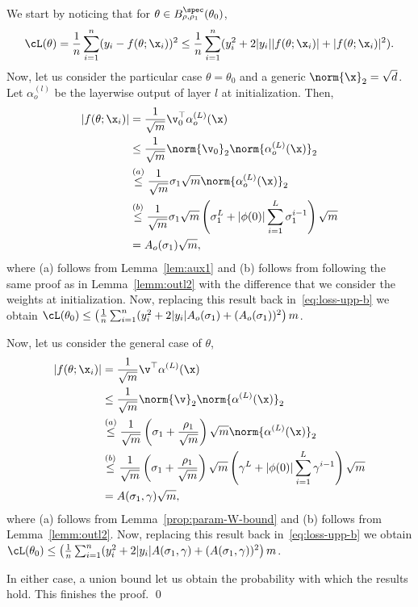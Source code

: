 \proof
We start by noticing that for $\theta \in B_{\rho,\rho_1}^{\spec}(\theta_0)$,
\begin{equation}
    \cL(\theta)=\frac{1}{n}\sum^n_{i=1}(y_i-f(\theta;\x_i))^2\leq\frac{1}{n}\sum^n_{i=1}(y_i^2+2|y_i||f(\theta;\x_i)|+|f(\theta;\x_i)|^2).
    \label{eq:loss-upp-b}
\end{equation}
%
Now, let us consider the particular case $\theta=\theta_0$ and a generic $\norm{\x}_2=\sqrt{d}$. Let $\alpha_o^{(l)}$ be the layerwise output of layer $l$ at initialization. Then,
\begin{align*}
    |f(\theta;\x_i)|&=\frac{1}{\sqrt{m}}\v_0^\top\alpha_o^{(L)}(\x)\\
    &\leq \frac{1}{\sqrt{m}}\norm{\v_0}_2\norm{\alpha_o^{(L)}(\x)}_2\\
    &\overset{(a)}{\leq}\frac{1}{\sqrt{m}}\sigma_1\sqrt{m}\norm{\alpha_o^{(L)}(\x)}_2\\
    &\overset{(b)}{\leq}\frac{1}{\sqrt{m}}\sigma_1\sqrt{m}\left(\sigma_1^L+|\phi(0)|\sum^L_{i=1}\sigma_1^{i-1}\right)\sqrt{m}\\
    &=A_o(\sigma_1)\sqrt{m},
\end{align*}
where (a) follows from Lemma~\ref{lem:aux1} and (b) follows from following the same proof as in Lemma~\ref{lemm:outl2} with the difference that we consider the weights at initialization. Now, replacing this result back in~\eqref{eq:loss-upp-b} we obtain $\cL(\theta_0)\leq\left(\frac{1}{n}\sum^n_{i=1}(y_i^2+2|y_i|A_o(\sigma_1)+(A_o(\sigma_1))^2\right)m$.

Now, let us consider the general case of $\theta$,
\begin{align*}
    |f(\theta;\x_i)|&=\frac{1}{\sqrt{m}}\v^\top\alpha^{(L)}(\x)\\
    &\leq \frac{1}{\sqrt{m}}\norm{\v}_2\norm{\alpha^{(L)}(\x)}_2\\
    &\overset{(a)}{\leq}\frac{1}{\sqrt{m}}\left(\sigma_1+\frac{\rho_1}{\sqrt{m}}\right)\sqrt{m}\norm{\alpha^{(L)}(\x)}_2\\
    &\overset{(b)}{\leq}\frac{1}{\sqrt{m}}\left(\sigma_1+\frac{\rho_1}{\sqrt{m}}\right)\sqrt{m}\left(\gamma^L+|\phi(0)|\sum^L_{i=1}\gamma^{i-1}\right)\sqrt{m}\\
    &=A(\sigma_1,\gamma)\sqrt{m},
\end{align*}
where (a) follows from Lemma~\ref{prop:param-W-bound} and (b) follows from Lemma~\ref{lemm:outl2}. Now, replacing this result back in~\eqref{eq:loss-upp-b} we obtain $\cL(\theta_0)\leq\left(\frac{1}{n}\sum^n_{i=1}(y_i^2+2|y_i|A(\sigma_1,\gamma)+(A(\sigma_1,\gamma))^2\right)m$.

In either case, a union bound let us obtain the probability with which the results hold. This finishes the proof.
%
%
\qed